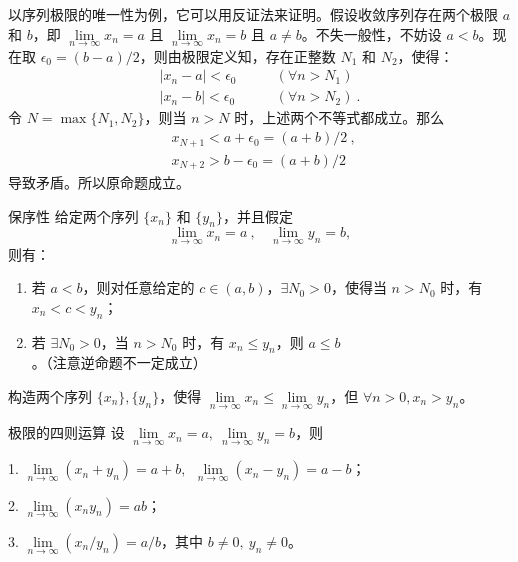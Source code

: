 以序列极限的唯一性为例，它可以用反证法来证明。假设收敛序列存在两个极限 $a$ 和 $b$，即 $\lim\limits_{n\rightarrow \infty}x_n=a$ 且 $\lim\limits_{n\rightarrow \infty} x_n=b$ 且 $a\neq b$。不失一般性，不妨设 $a<b$。现在取 $\epsilon_0=(b-a)/2$，则由极限定义知，存在正整数 $N_1$ 和 $N_2$，使得：
\begin{equation}
  \begin{aligned}
  |x_n-a|<\epsilon_0 \qquad &(\forall n>N_1)\\
  |x_n-b|<\epsilon_0 \qquad  &(\forall n>N_2)~.
  \end{aligned}
\end{equation}
  令 $N=\max\{N_1,N_2\}$，则当 $n>N$ 时，上述两个不等式都成立。那么
\begin{equation}
\begin{aligned}
  &x_{N+1} <a+\epsilon_0=(a+b)/2~,\\
  &x_{N+2} >b-\epsilon_0=(a+b)/2
\end{aligned}~
\end{equation}
  导致矛盾。所以原命题成立。

\begin{theorem}{保序性}
给定两个序列 $\{x_n\}$ 和 $\{y_n\}$，并且假定
\begin{equation}
  \lim\limits_{n\rightarrow \infty} x_n=a~,\ \ \ \ \lim\limits_{n\rightarrow \infty} y_n = b,
\end{equation}
  则有：
\begin{enumerate}
\item  若 $a<b$，则对任意给定的 $c\in (a,b)$，$\exists N_0>0$，使得当 $n>N_0$ 时，有 $x_n<c<y_n$；
\item  若 $\exists N_0>0$，当 $n>N_0$ 时，有 $x_n\leq y_n$，则 $a\leq b$。（注意逆命题不一定成立）
\end{enumerate}
\end{theorem}

\begin{exercise}{}

  构造两个序列 $\{x_n\},\{y_n\}$，使得 $\lim\limits_{n\rightarrow \infty}x_n\le \lim\limits_{n\rightarrow \infty} y_n$，但 $\forall n>0,x_n>y_n$。
\end{exercise}
\begin{theorem}{极限的四则运算}
  设 $\lim\limits_{n\rightarrow \infty} x_n=a,\ \lim\limits_{n\rightarrow \infty} y_n=b$，则

  1. $\lim\limits_{n\rightarrow \infty}(x_n+y_n)=a+b,\ \ \lim\limits_{n\rightarrow \infty}(x_n-y_n)=a-b$；

  2. $\lim\limits_{n\rightarrow \infty}(x_ny_n)=ab$；

  3. $\lim\limits_{n\rightarrow \infty}(x_n/y_n)=a/b$，其中 $b\neq 0,\ y_n\neq 0$。

\end{theorem}


